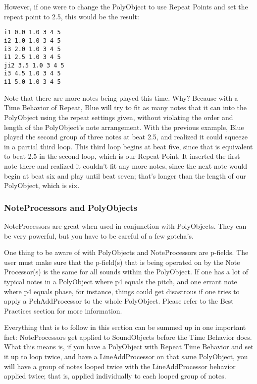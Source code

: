 However, if one were to change the PolyObject to use Repeat Points and
set the repeat point to 2.5, this would be the result:

\begin{verbatim}
i1 0.0 1.0 3 4 5
i2 1.0 1.0 3 4 5
i3 2.0 1.0 3 4 5
i1 2.5 1.0 3 4 5
ji2 3.5 1.0 3 4 5
i3 4.5 1.0 3 4 5
i1 5.0 1.0 3 4 5
\end{verbatim}

Note that there are more notes being played this time. Why? Because with
a Time Behavior of Repeat, Blue will try to fit as many notes that it
can into the PolyObject using the repeat settings given, without
violating the order and length of the PolyObject's note arrangement.
With the previous example, Blue played the second group of three notes
at beat 2.5, and realized it could squeeze in a partial third loop. This
third loop begins at beat five, since that is equivalent to beat 2.5 in
the second loop, which is our Repeat Point. It inserted the first note
there and realized it couldn't fit any more notes, since the next note
would begin at beat six and play until beat seven; that's longer than
the length of our PolyObject, which is six.

\subsubsection{NoteProcessors and PolyObjects}

NoteProcessors are great when used in conjunction with PolyObjects. They
can be very powerful, but you have to be careful of a few gotcha's.

One thing to be aware of with PolyObjects and NoteProcessors are
p-fields. The user must make sure that the p-field(s) that is being
operated on by the Note Processor(s) is the same for all sounds within
the PolyObject. If one has a lot of typical notes in a PolyObject where
p4 equals the pitch, and one errant note where p4 equals phase, for
instance, things could get disastrous if one tries to apply a
PchAddProcessor to the whole PolyObject. Please refer to the Best
Practices section for more information.

Everything that is to follow in this section can be summed up in one
important fact: NoteProcessors get applied to SoundObjects before the
Time Behavior does. What this means is, if you have a PolyObject with
Repeat Time Behavior and set it up to loop twice, and have a
LineAddProcessor on that same PolyObject, you will have a group of notes
looped twice with the LineAddProcessor behavior applied twice; that is,
applied individually to each looped group of notes.

